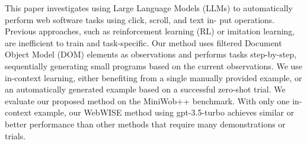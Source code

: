 This paper investigates using Large Language Models (LLMs) to automatically perform web software tasks using click, scroll, and text in- put operations. Previous approaches, such as reinforcement learning (RL) or imitation learning, are inefficient to train and task-specific. Our method uses filtered Document Object Model (DOM) elements as observations and performs tasks step-by-step, sequentially generating small programs based on the current observations. We use in-context learning, either benefiting from a single manually provided example, or an automatically generated example based on a successful zero-shot trial. We evaluate our proposed method on the MiniWob++ benchmark. With only one in-context example, our WebWISE method using gpt-3.5-turbo achieves similar or better performance than other methods that require many demonstrations or trials.